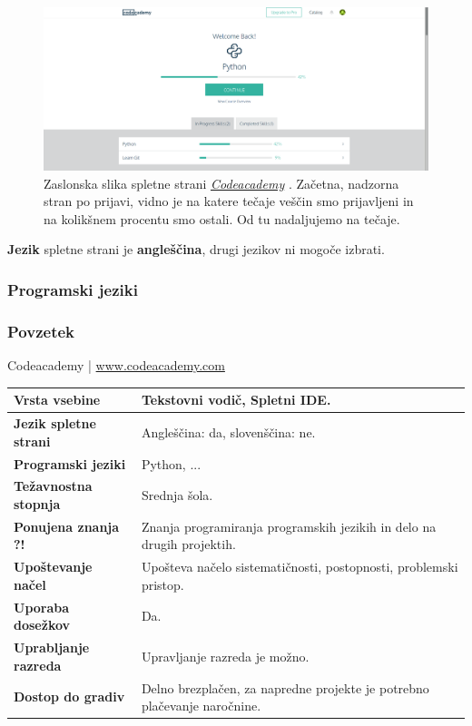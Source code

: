 \begin{figure}[h!]
    \includegraphics [width=1\linewidth, keepaspectratio =
    1] {./images/sc_web/codeacademy_login_01.png}
    \caption{Zaslonska slika spletne strani
      \emph{\href{https://www.codecademy.com/}{Codeacademy}}
      \cite{web:codeacademy}. Začetna, nadzorna stran po prijavi,
      vidno je na katere tečaje veščin smo prijavljeni in na kolikšnem
    procentu smo ostali. Od tu nadaljujemo na tečaje.}
    \label{fig:scr:web:codeacademy}
\end{figure}

\textbf{Jezik} spletne strani je \textbf{angleščina}, drugi jezikov ni
mogoče izbrati.

\subsubsection{Programski jeziki}
\label{sec:codeacaemy_programskiJ}



\subsubsection{Povzetek}

\begin{osebnabox}[label={osebna:codeacademy}]{Codeacademy | \url{www.codeacademy.com}}
    \begin{tabular}{
  p{} |
  p{}  }
  \textbf{Vrsta vsebine} & Tekstovni vodič, Spletni IDE. \\
      \hline
  \textbf{Jezik spletne strani} &  Angleščina: da, slovenščina: ne. \\
      \hline
  \textbf{Programski jeziki} & Python, ... \\
      \hline
  \textbf{Težavnostna stopnja} & Srednja šola. \\
      \hline
  \textbf{Ponujena znanja ?!} & Znanja programiranja programskih jezikih
      in delo na drugih projektih. \\
      \hline
  \textbf{Upoštevanje načel} & Upošteva načelo sistematičnosti,
      postopnosti, problemski pristop. \\
      \hline
  \textbf{Uporaba dosežkov} & Da. \\
      \hline
  \textbf{Uprabljanje razreda} & Upravljanje razreda je možno. \\
      \hline
  \textbf{Dostop do gradiv} & Delno brezplačen, za napredne projekte je
      potrebno plačevanje naročnine. \\
\end{tabular}
\end{osebnabox}

